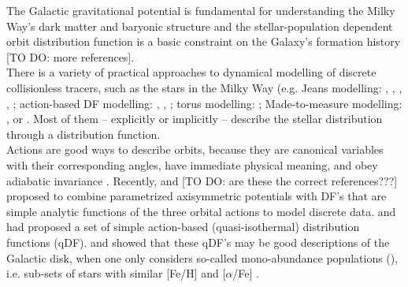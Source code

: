 The Galactic gravitational potential is fundamental for understanding the Milky Way's dark matter and baryonic structure \citep{rix13,2012EPJWC..1910002M,2013PhR...531....1S,2014JPhG...41f3101R} and the stellar-population dependent orbit distribution function is a basic constraint on the Galaxy's formation history \citep{2013NewAR..57...29B,rix13,2015MNRAS.449.3479S} [TO DO: more references].\\

There is a variety of practical approaches to dynamical modelling of discrete collisionless tracers, such as the stars in the Milky Way (e.g. Jeans modelling: \citet{1989MNRAS.239..605K}, \citet{2012ApJ...756...89B}, \citet{2012MNRAS.425.1445G}, \citet{2013ApJ...772..108Z}, \citet{bue15}; action-based DF modelling: \citet{bov13}, \citet{2014MNRAS.445.3133P}, \citet{2015MNRAS.449.3479S}; torus modelling:  \citet{2012MNRAS.419.2251M,2013MNRAS.433.1411M}; Made-to-measure modelling: \citet{sye96}, \citet{lor07} or \citet{hun14}. Most of them -- explicitly or implicitly -- describe the stellar distribution through a distribution function. \\

Actions are good ways to describe orbits, because they are canonical variables with their corresponding angles, have immediate physical meaning, and obey adiabatic invariance \citep{bin08,2008MNRAS.390..429M,2010MNRAS.401.2318B,2011MNRAS.413.1889B,2011Prama..77...39B}. Recently, \citet{2012MNRAS.426.1328B} and \citet{bov13} [TO DO: are these the correct references???] proposed to combine parametrized axisymmetric potentials with DF's that are simple analytic functions of the three orbital actions to model discrete data. \citet{2010MNRAS.401.2318B} and \citet{2011MNRAS.413.1889B} had proposed a set of simple action-based (quasi-isothermal) distribution functions (qDF). \citet{tin13} and \citet{bov13} showed that these qDF's may be good descriptions of the Galactic disk, when one only considers so-called mono-abundance populations (\MAP{}), i.e. sub-sets of stars with similar [Fe/H] and [$\alpha$/Fe] \citep{bov12b,bov12c,2012ApJ...753..148B}. \\

